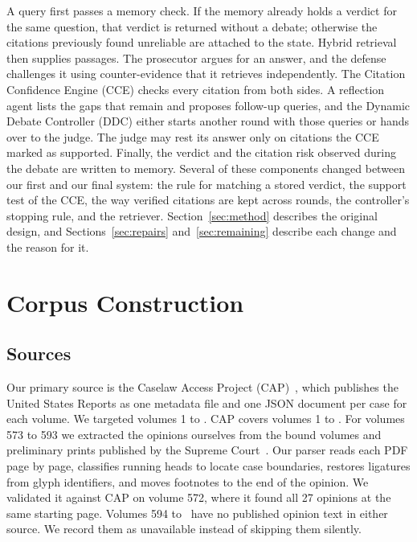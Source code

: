 \documentclass[conference]{IEEEtran}
\begin{document}
A query first passes a memory check. If the memory already holds a verdict for the same question, that verdict is returned without a debate; otherwise the citations previously found unreliable are attached to the state. Hybrid retrieval then supplies passages. The prosecutor argues for an answer, and the defense challenges it using counter-evidence that it retrieves independently. The Citation Confidence Engine (CCE) checks every citation from both sides. A reflection agent lists the gaps that remain and proposes follow-up queries, and the Dynamic Debate Controller (DDC) either starts another round with those queries or hands over to the judge. The judge may rest its answer only on citations the CCE marked as supported. Finally, the verdict and the citation risk observed during the debate are written to memory. Several of these components changed between our first and our final system: the rule for matching a stored verdict, the support test of the CCE, the way verified citations are kept across rounds, the controller's stopping rule, and the retriever. Section~\ref{sec:method} describes the original design, and Sections~\ref{sec:repairs} and~\ref{sec:remaining} describe each change and the reason for it.

\section{Corpus Construction}

\subsection{Sources}
Our primary source is the Caselaw Access Project (CAP)~\cite{cap}, which publishes the United States Reports as one metadata file and one JSON document per case for each volume. We targeted volumes 1 to \ResCorpusVolumesTarget. CAP covers volumes 1 to \ResCorpusVolumesCap. For volumes 573 to 593 we extracted the opinions ourselves from the bound volumes and preliminary prints published by the Supreme Court~\cite{usreports}. Our parser reads each PDF page by page, classifies running heads to locate case boundaries, restores ligatures from glyph identifiers, and moves footnotes to the end of the opinion. We validated it against CAP on volume 572, where it found all 27 opinions at the same starting page. Volumes 594 to \ResCorpusVolumesTarget\ have no published opinion text in either source. We record them as unavailable instead of skipping them silently.
\end{document}
